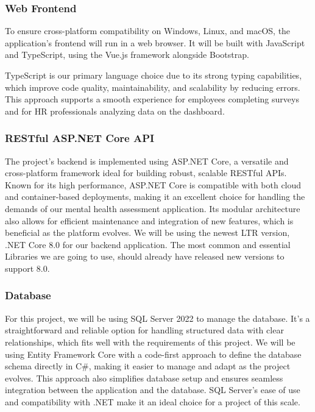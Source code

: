 \documentclass[conference]{IEEEtran}
\begin{document}
            \subsubsection{Web Frontend}

                To ensure cross-platform compatibility on Windows, Linux, 
                and macOS, the application's frontend will run in a web 
                browser. It will be built with JavaScript and TypeScript, 
                using the Vue.js framework alongside Bootstrap. 
                \newline
                
                TypeScript is our primary language choice due to its strong typing capabilities, which improve code quality, maintainability, and scalability by reducing errors. This approach supports a smooth experience for employees completing surveys and for HR professionals analyzing data on the dashboard.
                \newline
    
            \subsubsection{RESTful ASP.NET Core API}

                The project’s backend is implemented using ASP.NET Core, 
                a versatile and cross-platform framework ideal for building 
                robust, scalable RESTful APIs. Known for its high performance, ASP.NET Core is compatible with both cloud and container-based deployments, making it an excellent choice for handling the demands of our mental health assessment application. Its modular architecture also allows for efficient maintenance and integration of new features, which is beneficial as the platform evolves. We will be using the newest LTR version, .NET Core 8.0 for our backend application. The most common and essential Libraries we are going to use, should already have released new versions to support 8.0.
                \newline

            \subsubsection{Database}

                For this project, we will be using SQL Server 2022 to manage the database. It’s a straightforward and reliable option for handling structured data with clear relationships, which fits well with the requirements of this project. We will be using Entity Framework Core with a code-first approach to define the database schema directly in C\#, making it easier to manage and adapt as the project evolves. This approach also simplifies database setup and ensures seamless integration between the application and the database. SQL Server’s ease of use and compatibility with .NET make it an ideal choice for a project of this scale.
\end{document}

